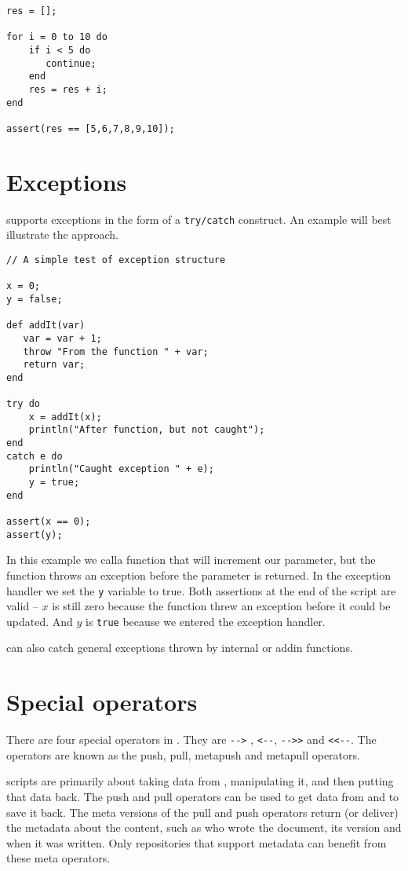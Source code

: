 \begin{lstlisting}[caption={Continue in for loop}]
res = [];

for i = 0 to 10 do
    if i < 5 do
       continue;
    end
    res = res + i;
end

assert(res == [5,6,7,8,9,10]);
\end{lstlisting}

\chapter{Exceptions}
\Reflex supports exceptions in the form of a \Verb+try/catch+ construct. An example will best illustrate the approach.
\begin{lstlisting}[caption={Exception handling}]
// A simple test of exception structure

x = 0;
y = false;

def addIt(var)
   var = var + 1;
   throw "From the function " + var;
   return var;
end

try do
    x = addIt(x);
    println("After function, but not caught");
end
catch e do
    println("Caught exception " + e);
    y = true;
end

assert(x == 0);
assert(y);

\end{lstlisting}

In this example we calla function that will increment our parameter, but the function throws an exception before the parameter is returned. In the exception handler we set the \Verb+y+ variable to true. Both assertions at the end of the script are valid -- $x$ is still zero because the function threw an exception before it could be updated. And $y$ is \verb+true+ because we entered the exception handler.

\Reflex can also catch general exceptions thrown by internal or addin functions.

\chapter{Special operators}
There are four special operators in \Reflex. They are \Verb+-->+ , \verb+<--+, \verb+-->>+ and \verb+<<--+. The operators are known as the push, pull, metapush and metapull operators.

\Reflex scripts are primarily about taking data from \Rapture, manipulating it, and then putting that data back. The push and pull operators can be used to get data from \Rapture and to save it back. The meta versions of the pull and push operators return (or deliver) the metadata about the content, such as who wrote the document, its version and when it was written. Only repositories that support metadata can benefit from these meta operators.

